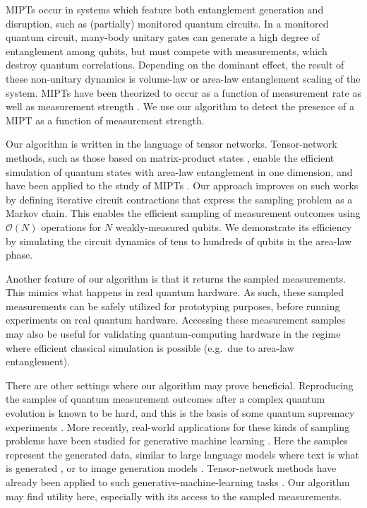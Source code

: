 \documentclass[reprint,amsmath,amssymb,aps, twocolumn, superscriptaddress, prb]{revtex4-2}
\begin{document}
MIPTs occur in systems which feature both entanglement generation and disruption, such as (partially) monitored quantum circuits. In a monitored quantum circuit, many-body unitary gates can generate a high degree of entanglement among qubits, but must compete with measurements, which destroy quantum correlations. Depending on the dominant effect, the result of these non-unitary dynamics is volume-law or area-law entanglement scaling of the system. MIPTs have been theorized to occur as a function of measurement rate \cite{skinner2019measurement, JianPRB2020,BaoPRB2020, RQCAnnuRev2023,PotterVasseurChapter2022} as well as measurement strength \cite{SzyniszewskiPRB2019,lee2023quantum, SuPRL2024,BulchandaniJStatPhys2024,AzizPRB2024,BaoPRB2020}. We use our algorithm to detect the presence of a MIPT as a function of measurement strength.

Our algorithm is written in the language of tensor networks. Tensor-network methods, such as those based on matrix-product states \cite{SchollwockAnnPhys2011},
enable the efficient simulation of quantum states with area-law entanglement in one dimension,
and have been applied to the study of MIPTs
\cite{TangPhysRevRes2020,DoggenPhysRevRes2022,CecilePhysRevRes2024,LoioPRB2025,BarrattPRL2022,MelkoPRA2021,YanayPRL2024}. Our approach improves on such works by
defining iterative circuit contractions that 
express the sampling problem as a Markov chain. This enables the efficient sampling  of measurement outcomes 
using $\mathcal O(N)$ operations for $N$ weakly-measured qubits. 
We demonstrate its efficiency by simulating the circuit dynamics of tens to hundreds of qubits in the area-law phase.


Another feature of our algorithm is that it returns the sampled measurements. This mimics what happens in real quantum hardware. As such, these sampled measurements can be safely utilized for prototyping purposes, 
before running experiments on real quantum hardware. Accessing these measurement samples may also be useful for validating quantum-computing hardware in the 
regime where efficient classical simulation is possible (e.g.~due to area-law entanglement). 

There are other settings where our algorithm may prove beneficial. Reproducing the samples of quantum measurement outcomes 
after a complex quantum evolution is known to be hard, and  this is the basis of some
quantum supremacy experiments \cite{arute2019quantum}.
More recently, real-world applications for these kinds of sampling problems have been 
studied for generative machine learning \cite{huang2025generative}. Here the samples 
represent the generated data, similar to large language models where text is what is generated \cite{radford2018improving}, or to image generation models \cite{ho2020denoising}. 
Tensor-network methods have already been applied to such generative-machine-learning tasks 
\cite{han2018unsupervised,stoudenmire2016supervised,wall2021generative,meiburg2025generative}. Our algorithm may find utility here, especially with its access to the sampled measurements.
\end{document}
